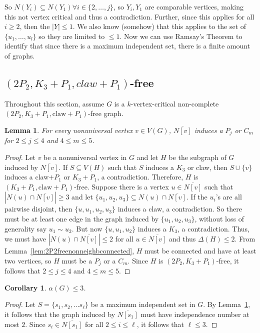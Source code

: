 \documentclass[11pt]{article}
\newtheorem{lemma}[theorem]{Lemma}
\newtheorem{corollary}[theorem]{Corollary}
\theoremstyle{definition}
\newcommand{\noneighbs}{\overline{N[v]}}
\begin{document}
So $N(Y_i) \subseteq N(Y_1) \forall i \in \{2, \dots, j\}$, so $Y_i, Y_1$ are comparable vertices, making this not vertex critical and thus a contradiction. Further, since this applies for all $i \geq 2$, then the $|Y| \leq 1$. We also know (somehow) that this applies to the set of $\{u_1, \dots, u_l \}$ so they are limited to $\leq 1$.
Now we can use Ramsay's Theorem to identify that since there is a maximum independent set, there is a finite amount of graphs.

\subsection{$(2P_2, K_3 + P_1, claw + P_1)$-free}

Throughout this section, assume $G$ is a $k$-vertex-critical non-complete $(2P_2, K_3 + P_1, \text{claw} + P_1)$-free graph. 



\begin{lemma}\label{lem:pathorcyclenonneighbourhood}
For every nonuniversal vertex $v\in V(G)$, $\noneighbs$ induces a $P_j$ or $C_m$ for $2\le j\le 4$ and $4\le m\le 5$.
\end{lemma}
\begin{proof}
Let $v$ be a nonuniversal vertex in $G$ and let $H$ be the subgraph of $G$ induced by $\noneighbs$. If $S\subseteq V(H)$ such that $S$ induces a $K_3$ or claw, then $S\cup\{v\}$ induces a claw$+P_1$ or $K_3+P_1$, a contradiction. Therefore, $H$ is $(K_3+P_1,\text{claw}+P_1)$-free. Suppose there is a vertex $u\in \noneighbs$ such that $|N(u)\cap \noneighbs|\ge 3$ and let $\{u_1,u_2,u_3\}\subseteq N(u)\cap \noneighbs$. If the $u_i$'s are all pairwise disjoint, then $\{u,u_1,u_2,u_3\}$ induces a claw, a contradiction. So there must be at least one edge in the graph induced by $\{u_1,u_2,u_3\}$, without loss of generality say $u_1\sim u_2$. But now $\{u,u_1,u_2\}$ induces a $K_3$, a contradiction. Thus, we must have $|N(u)\cap \noneighbs|\le 2$ for all $u\in \noneighbs$ and thus $\Delta(H)\le 2$. From Lemma~\ref{lem:2P2freenonneighbconnected}, $H$ must be connected and have at least two vertices, so $H$ must be a $P_j$ or a $C_m$. Since $H$ is $(2P_2,K_3+P_1)$-free, it follows that $2\le j\le 4$ and $4\le m\le 5$. 
\end{proof}


\begin{corollary}\label{cor:indnumatmost3}
$\alpha(G)\le 3$.
\end{corollary}
\begin{proof}
Let $S=\{s_1,s_2,\dots s_{\ell}\}$ be a maximum independent set in $G$. By Lemma~\ref{lem:pathorcyclenonneighbourhood}, it follows that the graph induced by $\overline{N[s_1]}$ must have independence number at most $2$. Since $s_i\in \overline{N[s_1]}$ for all $2\le i\le \ell$, it follows that $\ell\le 3$.
\end{proof}
\end{document}
